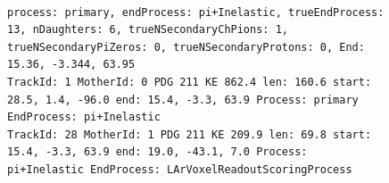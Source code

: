 \documentclass[letterpaper,12pt]{article}
\begin{document}
\begin{figure}[!hbtp]
  \begin{center}
\\
\begin{lstlisting}
process: primary, endProcess: pi+Inelastic, trueEndProcess: 13, nDaughters: 6, trueNSecondaryChPions: 1, trueNSecondaryPiZeros: 0, trueNSecondaryProtons: 0, End: 15.36, -3.344, 63.95
TrackId: 1 MotherId: 0 PDG 211 KE 862.4 len: 160.6 start: 28.5, 1.4, -96.0 end: 15.4, -3.3, 63.9 Process: primary EndProcess: pi+Inelastic
TrackId: 28 MotherId: 1 PDG 211 KE 209.9 len: 69.8 start: 15.4, -3.3, 63.9 end: 19.0, -43.1, 7.0 Process: pi+Inelastic EndProcess: LArVoxelReadoutScoringProcess

\end{lstlisting}
\end{center}
\end{figure}
\end{document}
